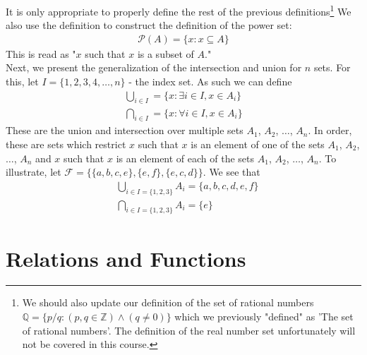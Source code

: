 \documentclass{tufte-handout} %
\theoremstyle{definition}
\theoremstyle{remark}
\begin{document}
It is only appropriate to properly define the rest of the previous definitions\footnote{We should also update our definition of the set of rational numbers $\mathbb{Q} = \{{p}/{q}: (p,q\in \mathbb{Z}) \wedge (q\neq 0) \}$ which we previously "defined" as 'The set of rational numbers'. The definition of the real number set unfortunately will not be covered in this course.} We also use the definition to construct the definition of the power set:
\begin{align*}
    \mathcal{P}(A) = \{x: x \subseteq A\}
\end{align*}
This is read as "$x$ such that $x$ is a subset of $A$."\\
Next, we present the generalization of the intersection and union for $n$ sets. For this, let $I=\{1,2,3,4,\ldots,n\}$ - the index set. As such we can define
\begin{align*}
    \bigcup_{i\in I} = \{x: \exists i \in I, x\in A_{i}\} \\
    \bigcap_{i\in I} = \{x: \forall i\in I, x\in A_{i}\}
\end{align*}
These are the union and intersection over multiple sets $A_{1}$, $A_{2}$, $\ldots$, $A_{n}$. In order, these are sets which restrict $x$ such that $x$ is an element of one of the sets $A_{1}$, $A_{2}$, $\ldots$, $A_{n}$ and $x$ such that $x$ is an element of each of the sets $A_{1}$, $A_{2}$, $\ldots$, $A_{n}$. To illustrate, let $\mathcal{F}=\{\{a,b,c,e\},\{e,f\}, \{e,c,d\}\}$. We see that 
\begin{align*}
    &\bigcup_{i\in I=\{1,2,3\}} A_{i} = \{a,b,c,d,e,f\} \\
    &\bigcap_{i\in I=\{1,2,3\}} A_{i} = \{e\} 
\end{align*}

\section{Relations and Functions}
\end{document}
